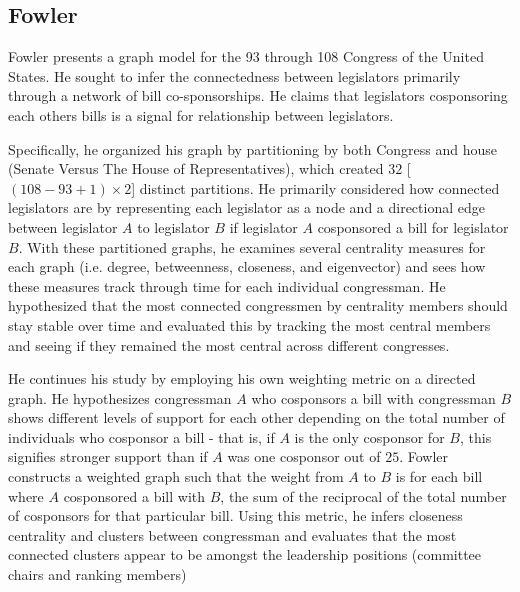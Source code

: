 \subsection{Fowler}

\vspace{5mm}
\noindent
Fowler presents a graph model for the 93 through 108 Congress of the United 
States. He sought to infer the connectedness between legislators primarily 
through a network of bill co-sponsorships. He claims that legislators 
cosponsoring each others bills is a signal for relationship between legislators.

\vspace{5mm}
\noindent
Specifically, he organized his graph by partitioning by both Congress and house 
(Senate Versus The House of Representatives), which created $32$ 
[$(108 - 93 + 1) \times 2$] distinct partitions. He primarily considered how 
connected legislators are by representing each legislator as a node and a 
directional edge between legislator $A$ to legislator $B$ if legislator $A$ 
cosponsored a bill for legislator $B$. With these partitioned graphs, he 
examines several centrality measures for each graph (i.e. degree, betweenness, 
closeness, and eigenvector) and sees how these measures track through time for 
each individual congressman. He hypothesized that the most connected 
congressmen by centrality members should stay stable over time and evaluated 
this by tracking the most central members and seeing if they remained the 
most central across different congresses.

\vspace{5mm}
\noindent
He continues his study by employing his own weighting metric on a directed 
graph. He hypothesizes congressman $A$ who cosponsors a bill with congressman 
$B$ shows different levels of support for each other depending on the total 
number of individuals who cosponsor a bill - that is, if $A$ is the only 
cosponsor for $B$, this signifies stronger support than if $A$ was one 
cosponsor out of $25$. Fowler constructs a weighted graph such that the weight 
from $A$ to $B$ is for each bill where $A$ cosponsored a bill with $B$, the 
sum of the reciprocal of the total number of cosponsors for that particular 
bill. Using this metric, he infers closeness centrality and clusters between 
congressman and evaluates that the most connected clusters appear to be 
amongst the leadership positions (committee chairs and ranking members)

